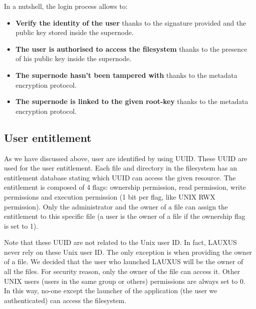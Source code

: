 \documentclass[../main.tex]{subfiles}
\begin{document}
\par In a nutshell, the login process allows to:
\begin{itemize}
    \item \textbf{Verify the identity of the user} thanks to the signature provided and the public key stored inside the supernode.
    \item \textbf{The user is authorised to access the filesystem} thanks to the presence of his public key inside the supernode.
    \item \textbf{The supernode hasn't been tampered with} thanks to the metadata encryption protocol.
    \item \textbf{The supernode is linked to the given root-key} thanks to the metadata encryption protocol.
\end{itemize}


\subsection{User entitlement}
\label{section:lauxus:user_entitlement}

\par As we have discussed above, user are identified by using UUID. These UUID are used for the user entitlement. Each file and directory in the filesystem has an entitlement database stating which UUID can access the given resource. The entitlement is composed of 4 flags: ownership permission, read permission, write permissions and execution permission (1 bit per flag, like UNIX RWX permission). Only the administrator and the owner of a file can assign the entitlement to this specific file (a user is the owner of a file if the ownership flag is set to 1).
\par Note that these UUID are not related to the Unix user ID. In fact, LAUXUS never rely on these Unix user ID. The only exception is when providing the owner of a file. We decided that the user who launched LAUXUS will be the owner of all the files. For security reason, only the owner of the file can access it. Other UNIX users (users in the same group or others) permissions are always set to 0. In this way, no-one except the launcher of the application (the user we authenticated) can access the filesystem.
\end{document}
